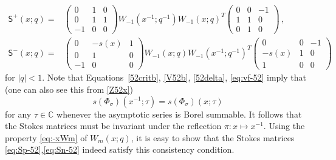 \documentclass[12pt,reqno]{amsart}
\theoremstyle{definition}
\def\s{\sigma}
\def\ms{\mathsf}
\def\IC{\mathbb{C}}
\begin{document}
\begin{subequations}
\begin{align}
    \ms{S}^+(x;q) =
    &\begin{pmatrix}
      0&1&0\\
      0&1&1\\
      -1&0&0
    \end{pmatrix}
               W_{-1}(x^{-1};q^{-1})
               W_{-1}(x;q)^T
              \begin{pmatrix}
                0&0&-1\\
                1&1&0\\
                0&1&0
              \end{pmatrix}\,,
  \label{eq:Sp-52}\\
    \ms{S}^-(x;q)=
    &\begin{pmatrix}
      0&-s(x)&1\\
      0&1&0\\
      -1&0&0
    \end{pmatrix}
            W_{-1}(x;q)
            W_{-1}(x^{-1};q^{-1})^T
              \begin{pmatrix}
                0&0&-1\\
                -s(x)&1&0\\
                1&0&0
              \end{pmatrix}
              \label{eq:Sn-52}
\end{align}
\end{subequations}
for $|q|<1$. Note that %
Equations~\eqref{52critb}, \eqref{V52b}, \eqref{52delta},
\eqref{eq:vf-52} imply that (one can also see this from \eqref{Z52x})
\begin{equation}
  s(\Phi_\s)(x^{-1};\tau) = s(\Phi_\s)(x;\tau)
\end{equation}
for any $\tau\in\IC$ whenever the asymptotic series is Borel summable.
It follows that the Stokes matrices must be invariant under the
reflection $\pi: x\mapsto x^{-1}$.  Using the property \eqref{eq:-xWm}
of $W_{m}(x;q)$, it is easy to show that the Stokes matrices
\eqref{eq:Sp-52},\eqref{eq:Sn-52} indeed satisfy this consistency
condition.
\end{document}
